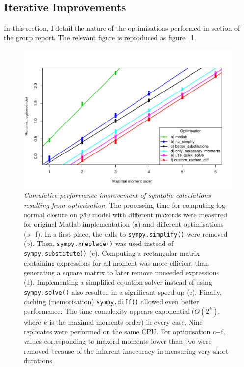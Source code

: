 \documentclass[11pt,a4paper]{article}
\newcommand{\pft}{\textit{p53}}
\newcommand{\citationneeded}[2][]{\todo[color=brown, fancyline, #1]{\textbf{Citation Needed:} #2}}
\begin{document}
 
\subsection{Iterative Improvements}
In this section, I detail the nature of the optimisations performed in section\citationneeded{} of the group report.
The relevant figure is reproduced as figure ~\ref{fig:mea_speed}.

\begin{figure}[tbh]
\includegraphics[width=0.95\textwidth{}]{mea_speed.pdf}
\caption{\emph{Cumulative performance improvement of symbolic 
calculations resulting from optimisation}.
The processing time for computing log-normal closure on \pft{} model with different \gls{maxord}s were measured for original Matlab implementation (a) and different optimisations (b$-$f).
In a first place, the calls to \texttt{sympy.simplify()} were removed (b). 
Then, \texttt{sympy.xreplace()} was used instead of \texttt{sympy.substitute()} (c). 
Computing a rectangular matrix containing expressions for all moment was more efficient than generating a square matrix to later remove unneeded expressions (d).
Implementing a simplified equation solver instead of using \texttt{sympy.solve()} also resulted in a significant speed-up (e). 
Finally, caching (memorisation) \texttt{sympy.diff()} allowed even better performance.
The time complexity appears exponential ($O(2^k)$, where $k$ is the maximal moments order) in every case, 
Nine replicates were performed on the same CPU. 
For optimisation c$-$f, values corresponding to \gls{maxord} moments lower than two were removed because of
the inherent inaccuracy in measuring very short durations.}
\label{fig:mea_speed}
\end{figure}
\end{document}
